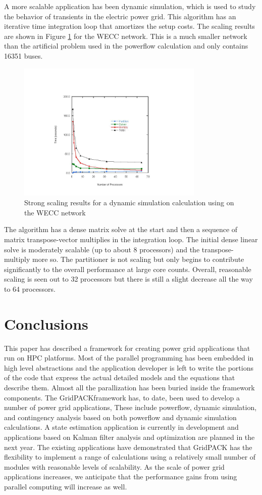 \documentclass[preprint]{acm_proc_article-sp}
\begin{document}
A more scalable application has been dynamic simulation, which is used to study
the behavior of transients in the electric power grid\cite{DS}. This algorithm has an
iterative time integration loop that amortizes the setup costs. The scaling
results are shown in Figure \ref{ds} for the WECC network. This is a much
smaller network than the artificial problem used in the powerflow calculation
and only contains 16351 buses.
\begin{figure}
\centering
\includegraphics[width=3.5in,keepaspectratio=true]{./FigDS}
\caption{\label{ds} Strong scaling results for a dynamic simulation calculation
using on the WECC network}
\end{figure}
The algorithm has a dense matrix solve at the start and then a sequence of matrix
transpose-vector multiplies in the integration loop. The initial dense linear
solve is moderately scalable (up to about 8 processors)
and the transpose-multiply more so. The partitioner
is not scaling but only begins to contribute significantly to the overall
performance at large core counts. Overall, reasonable scaling is seen out to 32
processors but there is still a slight decrease all the way to 64 processors.

\section{Conclusions}
This paper has described a framework for creating power grid applications that
run on HPC platforms. Most of the parallel programming has been embedded in high
level abstractions and the application developer is left to write the portions
of the code that express the actual detailed models and the equations that describe
them. Almost all the parallization has been buried inside the
framework components. The GridPACK\texttrademark framework has, to date, been
used to develop a number of power grid applications, These include powerflow,
dynamic simulation, and contingency analysis based on both powerflow and dynamic
simulation calculations. A state estimation application is currently in
development and applications based on Kalman filter analysis and optimization
are planned in the next year. The existing applications have demonstrated that
GridPACK has the flexibility to implement a range of calculations using a
relatively small number of modules with reasonable levels of scalability. As the
scale of power grid applications increases, we anticipate that the performance
gains from using parallel computing will increase as well.
\end{document}
